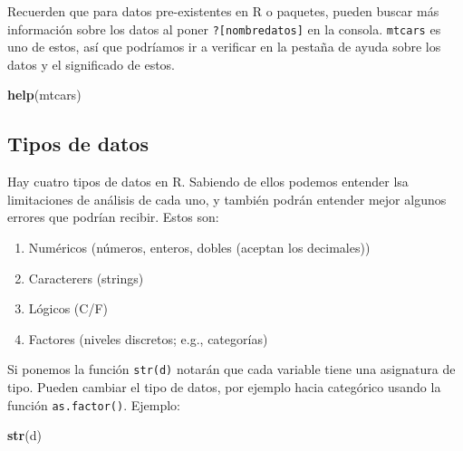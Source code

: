 \documentclass[
]{article}
\newenvironment{Shaded}{\begin{snugshade}}{\end{snugshade}}
\newcommand{\FunctionTok}[1]{\textcolor[rgb]{0.13,0.29,0.53}{\textbf{#1}}}
\newcommand{\NormalTok}[1]{#1}
\providecommand{\tightlist}{%
  \setlength{\itemsep}{0pt}\setlength{\parskip}{0pt}}
\begin{document}
Recuerden que para datos pre-existentes en R o paquetes, pueden buscar
más información sobre los datos al poner \texttt{?{[}nombredatos{]}} en
la consola. \texttt{mtcars} es uno de estos, así que podríamos ir a
verificar en la pestaña de ayuda sobre los datos y el significado de
estos.

\begin{Shaded}
\begin{Highlighting}[]
\FunctionTok{help}\NormalTok{(mtcars)}
\end{Highlighting}
\end{Shaded}

\subsection{Tipos de datos}\label{tipos-de-datos}

Hay cuatro tipos de datos en R. Sabiendo de ellos podemos entender lsa
limitaciones de análisis de cada uno, y también podrán entender mejor
algunos errores que podrían recibir. Estos son:

\begin{enumerate}
\def\labelenumi{\arabic{enumi}.}
\tightlist
\item
  Numéricos (números, enteros, dobles (aceptan los decimales))
\item
  Caracterers (strings)
\item
  Lógicos (C/F)
\item
  Factores (niveles discretos; e.g., categorías)
\end{enumerate}

Si ponemos la función \texttt{str(d)} notarán que cada variable tiene
una asignatura de tipo. Pueden cambiar el tipo de datos, por ejemplo
hacia categórico usando la función \texttt{as.factor()}. Ejemplo:

\begin{Shaded}
\begin{Highlighting}[]
\FunctionTok{str}\NormalTok{(d)}
\end{Highlighting}
\end{Shaded}
\end{document}
